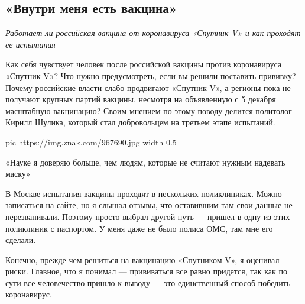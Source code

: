  
 
 
 
 
 
\subsection{«Внутри меня есть вакцина»}
\label{sec:09_12_2020.sites.ru.znak_com.1.vnutri_menja_est_vaccina}

\begin{leftbar}
  \begingroup
    \em
Работает ли российская вакцина от коронавируса «Спутник V» и как проходят ее
        испытания
  \endgroup
\end{leftbar}

Как себя чувствует человек после российской вакцины против коронавируса
«Спутник V»? Что нужно предусмотреть, если вы решили поставить прививку? Почему
российские власти слабо продвигают «Спутник V», а регионы пока не получают
крупных партий вакцины, несмотря на объявленную с 5 декабря масштабную
вакцинацию? Своим мнением по этому поводу делится политолог Кирилл Шулика,
который стал добровольцем на третьем этапе испытаний.

\ifcmt
  pic https://img.znak.com/967690.jpg
  width 0.5
\fi

«Науке я доверяю больше, чем людям, которые не считают нужным надевать маску»

В Москве испытания вакцины проходят в нескольких поликлиниках. Можно записаться
на сайте, но я слышал отзывы, что оставившим там свои данные не перезванивали.
Поэтому просто выбрал другой путь — пришел в одну из этих поликлиник с
паспортом. У меня даже не было полиса ОМС, там мне его сделали.

Конечно, прежде чем решиться на вакцинацию «Спутником V», я оценивал риски.
Главное, что я понимал — прививаться все равно придется, так как по сути все
человечество пришло к выводу — это единственный способ победить коронавирус.

